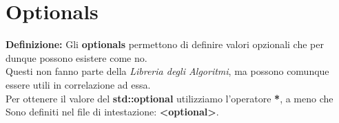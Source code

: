 \newpage

\section{Optionals}

\textsf{\small \textbf{Definizione: } Gli \textbf{optionals} permettono di definire valori opzionali che per dunque possono esistere come no.} \\

\textsf{\small Questi non fanno parte della \emph{Libreria degli Algoritmi}, ma possono comunque essere utili in correlazione ad essa.} \\

\textsf{\small Per ottenere il valore del \textbf{std::optional} utilizziamo l'operatore \textbf{*}, a meno che } \\

\textsf{\small Sono definiti nel file di intestazione: \textbf{<optional>}.} \\

